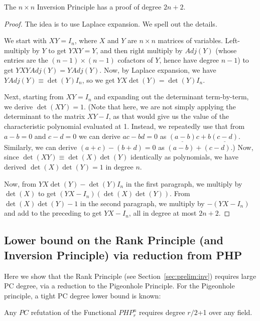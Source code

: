\begin{observation}
The $n \times n$ Inversion Principle has a proof of degree $2n+2$.
\end{observation}

\begin{proof}
The idea is to use Laplace expansion. We spell out the details.

We start with $XY = I_n$, where $X$ and $Y$ are $n \times n$ matrices of variables. Left-multiply by $Y$ to get $YXY = Y$, and then right multiply by $Adj(Y)$ (whose entries are the $(n-1) \times (n-1)$ cofactors of $Y$, hence have degree $n-1$) to get $YXYAdj(Y) = YAdj(Y)$. Now, by Laplace expansion, we have $Y Adj(Y) \equiv \det(Y) I_n$, so we get $YX \det(Y) = \det(Y) I_n$.

Next, starting from $XY=I_n$ and expanding out the determinant term-by-term, we derive $\det(XY) = 1$. (Note that here, we are not simply applying the determinant to the matrix $XY-I$, as that would give us the value of the characteristic polynomial evaluated at 1. Instead, we repeatedly use that from $a-b=0$ and $c-d=0$ we can derive $ac-bd=0$ as $\underline{(a-b)}c + b\underline{(c-d)}$. Similarly, we can derive $(a+c)-(b+d)=0$ as $(a-b) + (c-d)$.) Now, since $\det(XY) \equiv \det(X)\det(Y)$ identically as polynomials, we have derived $\det(X)\det(Y)=1$ in degree $n$.

Now, from $YX \det(Y) - \det(Y) I_n$ in the first paragraph, we multiply by $\det(X)$ to get $(YX - I_n)(\det(X)\det(Y))$. From $\det(X)\det(Y)-1$ in the second paragraph, we multiply by $-(YX-I_n)$ and add to the preceding to get $YX - I_n$, all in degree at most $2n+2$.
\end{proof}


\subsection{Lower bound on the Rank Principle (and Inversion Principle) via reduction from PHP}
\newcommand{\bbI}{\mathbb{I}}

Here we show that the Rank Principle (see Section~\ref{sec:prelim:inv}) requires large PC degree, via a reduction to the Pigeonhole Principle. 
For the Pigeonhole principle, a tight PC degree lower bound is known:


\begin{theorem}
\label{thm:PCdeglb}
Any $PC$ refutation of the Functional $PHP^n_r$ requires degree $r/2$+1 over any field.
\end{theorem}

